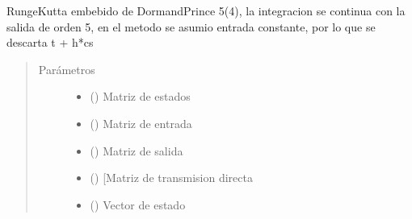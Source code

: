 \documentclass[letterpaper,10pt,spanish]{sphinxmanual}
\begin{document}
\begin{fulllineitems}
\label{\detokenize{codigos/rk_generator:rk_generator.dopri54}}
Runge\sphinxhyphen{}Kutta embebido de Dormand\sphinxhyphen{}Prince 5(4), la integracion se continua con la salida de orden 5, en el metodo se asumio entrada constante, por lo que se descarta t + h*cs
\begin{quote}\begin{description}
\item[{Parámetros}] \leavevmode\begin{itemize}
\item {} 
 (\sphinxstyleliteralemphasis{\sphinxupquote{, }}\sphinxstyleliteralemphasis{\sphinxupquote{, }}) \textendash{} Matriz de estados

\item {} 
 (\sphinxstyleliteralemphasis{\sphinxupquote{, }}\sphinxstyleliteralemphasis{\sphinxupquote{, }}) \textendash{} Matriz de entrada

\item {} 
 (\sphinxstyleliteralemphasis{\sphinxupquote{, }}\sphinxstyleliteralemphasis{\sphinxupquote{, }}) \textendash{} Matriz de salida

\item {} 
 (\sphinxstyleliteralemphasis{\sphinxupquote{, }}\sphinxstyleliteralemphasis{\sphinxupquote{, }}) \textendash{} {[}Matriz de transmision directa

\item {} 
 (\sphinxstyleliteralemphasis{\sphinxupquote{, }}\sphinxstyleliteralemphasis{\sphinxupquote{, }}) \textendash{} Vector de estado


\end{itemize}
\end{description}
\end{quote}
\end{fulllineitems}
\end{document}
